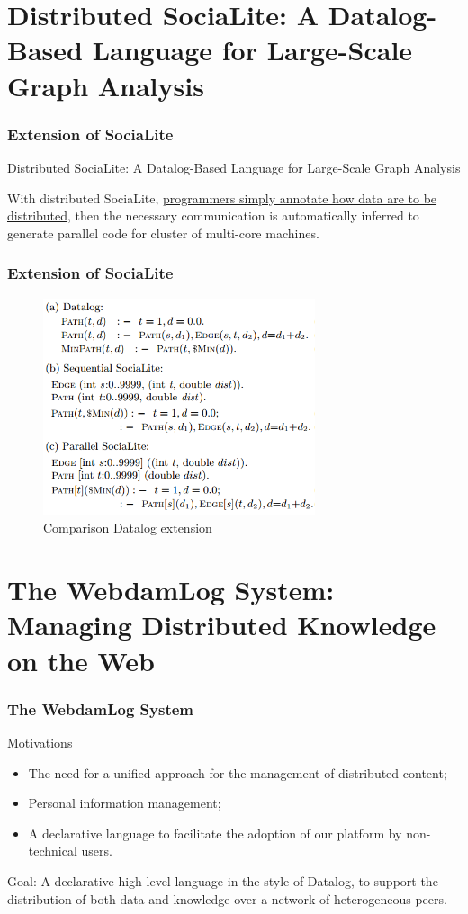 \documentclass{beamer}
\begin{document}
\section[Distributed SociaLite]{Distributed SociaLite: A Datalog-Based Language for Large-Scale Graph Analysis}
\frame
{
	\frametitle{Extension of SociaLite}
	\begin{block}{}
		Distributed SociaLite: A Datalog-Based Language for Large-Scale Graph Analysis
	\end{block}
	
	With distributed SociaLite, \underline{programmers simply annotate how data are to be distributed}, then the necessary communication is automatically inferred to generate parallel code for cluster of multi-core machines.
	

}

\frame
{
	\frametitle{Extension of SociaLite}
	\begin{figure}
		\centering
		\includegraphics[width=8cm]{comparison.png}
		\caption{Comparison Datalog extension}
	\end{figure}
	
}

\section[The WebdamLog System]{The WebdamLog System: Managing Distributed Knowledge on the Web}
\frame
{
	\frametitle{The WebdamLog System}
	
	Motivations
	\begin{itemize}
		\item The need for a unified approach for the management of distributed content;
		\item Personal information management;
		\item A declarative language to facilitate the adoption of our platform by non-technical users.
	\end{itemize}
	Goal: A declarative high-level language in the style of Datalog, to support the distribution of both data and knowledge over a network of heterogeneous peers.
}
\end{document}
